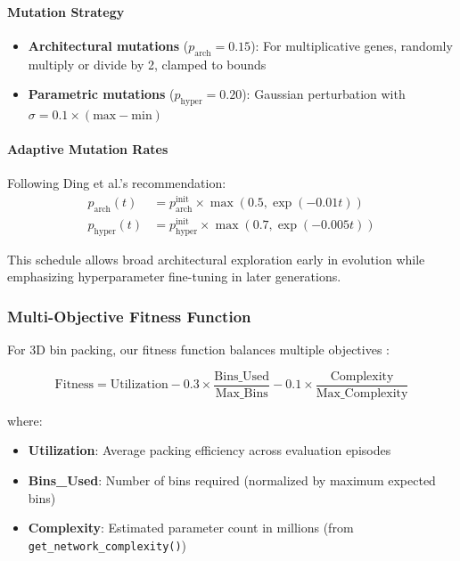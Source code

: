 \paragraph{Mutation Strategy}
\begin{itemize}
    \item \textbf{Architectural mutations} ($p_{\text{arch}} = 0.15$): For multiplicative genes, randomly multiply or divide by 2, clamped to bounds
    \item \textbf{Parametric mutations} ($p_{\text{hyper}} = 0.20$): Gaussian perturbation with $\sigma = 0.1 \times (\text{max} - \text{min})$
\end{itemize}

\paragraph{Adaptive Mutation Rates}
Following Ding et al.'s recommendation:
\begin{align}
p_{\text{arch}}(t) &= p_{\text{arch}}^{\text{init}} \times \max(0.5, \exp(-0.01t)) \\
p_{\text{hyper}}(t) &= p_{\text{hyper}}^{\text{init}} \times \max(0.7, \exp(-0.005t))
\end{align}

This schedule allows broad architectural exploration early in evolution while emphasizing hyperparameter fine-tuning in later generations.

\subsubsection{Multi-Objective Fitness Function}

For 3D bin packing, our fitness function balances multiple objectives \cite{Booysen2024}:

\begin{equation}
\text{Fitness} = \text{Utilization} - 0.3 \times \frac{\text{Bins\_Used}}{\text{Max\_Bins}} - 0.1 \times \frac{\text{Complexity}}{\text{Max\_Complexity}}
\end{equation}

where:
\begin{itemize}
    \item \textbf{Utilization}: Average packing efficiency across evaluation episodes
    \item \textbf{Bins\_Used}: Number of bins required (normalized by maximum expected bins)
    \item \textbf{Complexity}: Estimated parameter count in millions (from \texttt{get\_network\_complexity()})
\end{itemize}

